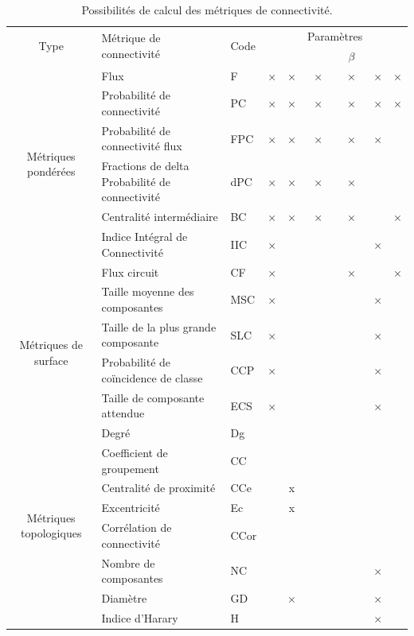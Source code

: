 \documentclass{article}
\begin{document}
\begin{table}[H]
\begin{tabular}{|c|m{5.162cm}|l|c|c|c|c|c|c|}
\hline
\multirow{2}{*}{Type} & \multirow{2}{*}{Métrique de connectivité} & \multirow{2}{*}{Code} & \multirow{2}{1.5cm}{\centering{Capacité des taches}} & \multirow{2}{1.5cm}{\centering{Distance intra-taches}} & \multicolumn{2}{m{1.8cm}|}{\centering Paramètres} & \multirow{2}{1.5cm}{\centering{Graphe par lot}} & \multirow{2}{1.55cm}{\centering{Paramètre par lot}}\\
\hhline{~~~~~--~~}
 & & & & & \multicolumn{1}{m{0.9cm}|}{\centering{$\alpha$}} & $\beta$ & & \\
\hline
\multirow{6}{2cm}{Métriques pondérées}
 & Flux & F & × & × & × & × & × & ×\\
 & Probabilité de connectivité & PC & × & × & × & × & × & ×\\
 & Probabilité de connectivité flux & FPC & × & × & × & × & × & \\
 & Fractions de delta Probabilité de connectivité & dPC & × & × & × & × &  & \\
 & Centralité intermédiaire & BC & × & × & × & × &  & ×\\
 & Indice Intégral de Connectivité & IIC & × &  &  &  & × & \\
 & Flux circuit & CF & × &  &  & × &  & ×\\
\hline
\multirow{4}{2cm}{Métriques de surface}
 & Taille moyenne des composantes & MSC & × &  &  &  & × & \\
 & Taille de la plus grande composante & SLC & × &  &  &  & × & \\
 & Probabilité de coïncidence de classe & CCP & × &  &  &  & × & \\
 & Taille de composante attendue & ECS & × &  &  &  & × & \\
\hline
\multirow{9}{2cm}{Métriques topologiques}
 & Degré & Dg &  &  &  &  &  & \\
 & Coefficient de groupement & CC &  &  &  &  &  & \\
 & Centralité de proximité & CCe &  & x &  &  &  & \\
 & Excentricité & Ec &  & x &  &  &  & \\
 & Corrélation de connectivité & CCor &  &  &  &  &  & \\
 & Nombre de composantes & NC &  &  &  &  & × & \\
 & Diamètre & GD &  & × &  &  & × & \\
 & Indice d’Harary & H &  &  &  &  & × & \\
\hline
\end{tabular}
\caption{Possibilités de calcul des métriques de connectivité.}
\label{metric_poss}
\end{table}
\end{document}
